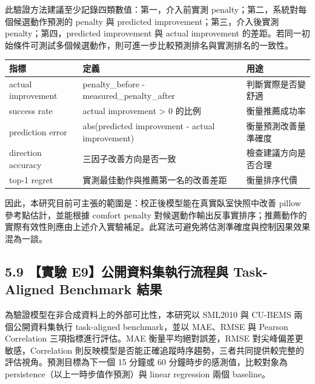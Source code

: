 \documentclass[12pt,a4paper]{article}
\begin{document}
此驗證方法建議至少記錄四類數值：第一，介入前實測 penalty；第二，系統對每個候選動作預測的 penalty 與 predicted improvement；第三，介入後實測 penalty；第四，predicted improvement 與 actual improvement 的差距。若同一初始條件可測試多個候選動作，則可進一步比較預測排名與實測排名的一致性。


\begin{table}[htbp]
\centering
\footnotesize
\renewcommand{\arraystretch}{1.25}
\begin{tabular}{|>{\raggedright\arraybackslash}p{}|>{\raggedright\arraybackslash}p{}|>{\raggedright\arraybackslash}p{}|}
\hline
\textbf{指標} & \textbf{定義} & \textbf{用途} \\
\hline
actual improvement & penalty\_\allowbreak{}before - measured\_\allowbreak{}penalty\_\allowbreak{}after & 判斷實際是否變舒適 \\
\hline
success rate & actual improvement > 0 的比例 & 衡量推薦成功率 \\
\hline
prediction error & abs(predicted improvement - actual improvement) & 衡量預測改善量準確度 \\
\hline
direction accuracy & 三因子改善方向是否一致 & 檢查建議方向是否合理 \\
\hline
top-1 regret & 實測最佳動作與推薦第一名的改善差距 & 衡量排序代價 \\
\hline
\end{tabular}
\end{table}

因此，本研究目前可主張的範圍是：校正後模型能在真實臥室快照中改善 pillow 參考點估計，並能根據 comfort penalty 對候選動作輸出反事實排序；推薦動作的實際有效性則應由上述介入實驗補足。此寫法可避免將估測準確度與控制因果效果混為一談。


\subsection*{5.9 【實驗 E9】公開資料集執行流程與 Task-Aligned Benchmark 結果}

為驗證模型在非合成資料上的外部可比性，本研究以 SML2010 與 CU-BEMS 兩個公開資料集執行 task-aligned benchmark，並以 MAE、RMSE 與 Pearson Correlation 三項指標進行評估。MAE 衡量平均絕對誤差，RMSE 對尖峰偏差更敏感，Correlation 則反映模型是否能正確追蹤時序趨勢，三者共同提供較完整的評估視角。預測目標為下一個 15 分鐘或 60 分鐘時步的感測值，比較對象為 persistence（以上一時步值作預測）與 linear regression 兩個 baseline。
\end{document}
